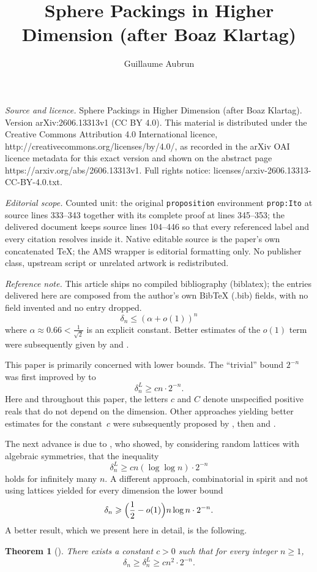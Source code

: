 \documentclass[10pt,a4paper]{amsart}
\renewcommand{\leq}{\leqslant}
\renewcommand{\geq}{\geqslant}
\newtheorem{theorem}{Theorem}
\begin{document}
\title[Sphere Packings in Higher Dimension (after Boaz Klartag)]{Sphere Packings in Higher Dimension (after Boaz Klartag)}
\author{Guillaume Aubrun}
\date{}
\maketitle
\noindent\emph{Source and licence.} Sphere Packings in Higher Dimension (after Boaz Klartag). Version arXiv:2606.13313v1 (CC BY 4.0). This material is distributed under the Creative Commons Attribution 4.0 International licence, http://creativecommons.org/licenses/by/4.0/, as recorded in the arXiv OAI licence metadata for this exact version and shown on the abstract page https://arxiv.org/abs/2606.13313v1. Full rights notice: licenses/arxiv-2606.13313-CC-BY-4.0.txt.\par\smallskip
\noindent\textit{Editorial scope.} Counted unit: the original \texttt{proposition} environment \texttt{prop:Ito} at source lines 333--343 together with its complete proof at lines 345--353; the delivered document keeps source lines 104--446 so that every referenced label and every citation resolves inside it. Native editable source is the paper's own concatenated TeX; the AMS wrapper is editorial formatting only. No publisher class, upstream script or unrelated artwork is redistributed.
\par\smallskip\noindent\textit{Reference note.} This article ships no compiled bibliography (biblatex); the entries delivered here are composed from the author's own BibTeX (.bib) fields, with no field invented and no entry dropped.
\begin{equation} \label{eq:KL}  \delta_n \leq ( \alpha+o(1)) ^n \end{equation}
where $\alpha \approx 0.66 < \frac{1}{\sqrt{2}}$ is an explicit constant. Better estimates of the $o(1)$ term were subsequently given by \cite{CZ14} and \cite{SZ24}.
 
This paper is primarily concerned with lower bounds.
The ``trivial'' bound $2^{-n}$ was first improved by \cite{Rogers47} to
\begin{equation}
\label{eq:rogers}
 \delta_n^L \geq c n  \cdot 2^{-n}. \end{equation}
Here and throughout this paper, the letters $c$ and $C$ denote unspecified positive reals that do not depend on the dimension.
Other approaches yielding better estimates for the constant~$c$ were subsequently proposed by \cite{DR47}, then \cite{Ball92} and \cite{Vance11}.
 
The next advance is due to \cite{Venkatesh13}, who showed,
by considering random lattices with algebraic symmetries, that the inequality
\[  \delta_n^L \geq c n (\log \log n) \cdot 2^{-n} \]
holds for infinitely many $n$. A different approach, combinatorial in spirit and not using lattices \cite{CJMS23} yielded for every dimension the lower bound
\[ \delta_n \geq \Bigl( \frac{1}{2} - o(1) \Bigr) n \log n \cdot 2^{-n} .\]
A better result, which we present here in detail, is the following.
\begin{theorem}[\cite{Klartag26}] \label{theo:main}
There exists a constant $c>0$ such that for every integer $n \geq 1$,
\[ \delta_n \geq \delta_n^L \geq c n^2 \cdot 2^{-n} .\]
\end{theorem}
\end{document}
